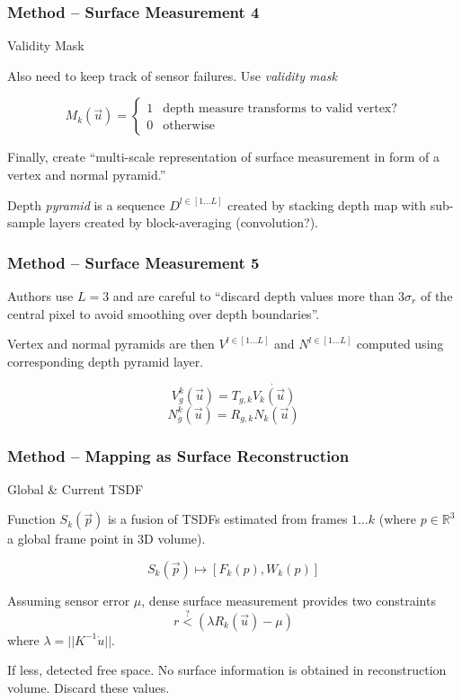 \begin{frame}
\frametitle{Method -- Surface Measurement 4}
{\large Validity Mask}

Also need to keep track of sensor failures. Use \textit{validity mask}

\[ M_k(\vec{u}) = \begin{cases} 1 & \text{depth measure transforms to valid vertex?} \\
  0 & \text{otherwise} \end{cases} \]

Finally, create ``multi-scale representation of surface measurement in form of a vertex and
normal pyramid.''

Depth \textit{pyramid} is a sequence $D^{l \in [1 \dots L ]}$ created by stacking
depth map with sub-sample layers created by block-averaging (convolution?).
\end{frame}

\begin{frame}
\frametitle{Method -- Surface Measurement 5}

Authors use $L=3$ and are careful to ``discard depth values more than $3\sigma_r$
of the central pixel to avoid smoothing over depth boundaries''.

Vertex and normal pyramids are then $V^{l \in [1 \dots L]}$ and $N^{l \in [1 \dots L ]}$
computed using corresponding depth pyramid layer.

\[V_g^k(\vec{u}) = T_{g,k}\dot{V_k(\vec{u})} \]
\[N_g^k(\vec{u}) = R_{g,k}N_k(\vec{u}) \]
\end{frame}


\begin{frame}
\frametitle{Method -- Mapping as Surface Reconstruction}
{\Large Global \& Current TSDF}

Function $S_k(\vec{p})$ is a fusion of TSDFs estimated
 from frames $1 \dots k$ (where $p \in \mathbb{R}^3$ a global frame point in 3D volume).

\[ S_k(\vec{p}) \mapsto [F_k(p), W_k(p)] \]

Assuming sensor error $\mu$, dense surface measurement provides two constraints
\[ r \overset{?}{<} (\lambda R_k(\vec{u}) - \mu) \]
where $\lambda = || K^{-1}\dot{u}||$.

If less, detected free space. No surface information is obtained in reconstruction volume.
Discard these values.
\end{frame}

